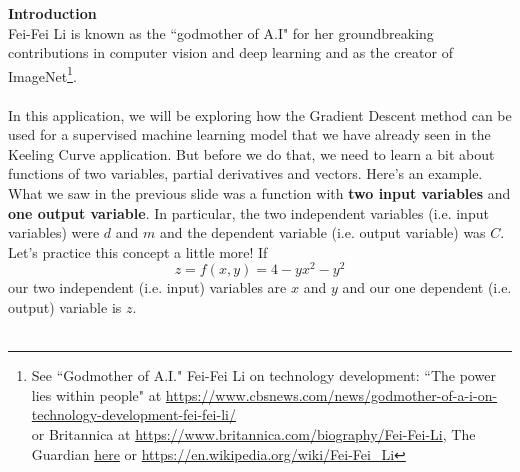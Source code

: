 \documentclass[11pt]{article}
\begin{document}
\pagestyle{otherpages}
\thispagestyle{firstpage}
\vspace*{.65in}

{\bf Introduction}\\
Fei-Fei Li is  known as the ``godmother of A.I" for her  groundbreaking contributions in computer vision and deep learning and as the creator of ImageNet\footnote{
See ``Godmother of A.I." Fei-Fei Li on technology development: ``The power lies within people" at \url{https://www.cbsnews.com/news/godmother-of-a-i-on-technology-development-fei-fei-li/}\\
 or Britannica at \url{https://www.britannica.com/biography/Fei-Fei-Li}, The Guardian \href{https://www.theguardian.com/technology/2023/nov/05/ai-pioneer-fei-fei-li-im-more-concerned-about- the-risks-that-are-here-and-now}{\underline{here}} or \url{https://en.wikipedia.org/wiki/Fei-Fei_Li} }. 
~\\\\
{In this application, we will be exploring how the Gradient Descent method can be used for a supervised machine learning model that we have already seen in the Keeling Curve application.  But before we do that, we need to learn a bit about functions of two variables, partial derivatives and vectors. Here's an example.
}
 ~\\What we saw in the previous slide was a function with {\bf two input variables} and {\bf one output variable}. In particular, the two independent variables (i.e. input variables) were $d$ and $m$ and the dependent variable (i.e. output variable) was $C$. Let's practice this concept a little more! If $$z=f(x,y)=4-yx^2-y^2$$ our two independent (i.e. input) variables are $x$ and $y$ and our one dependent (i.e. output) variable is $z$.  \\\\
\end{document}
